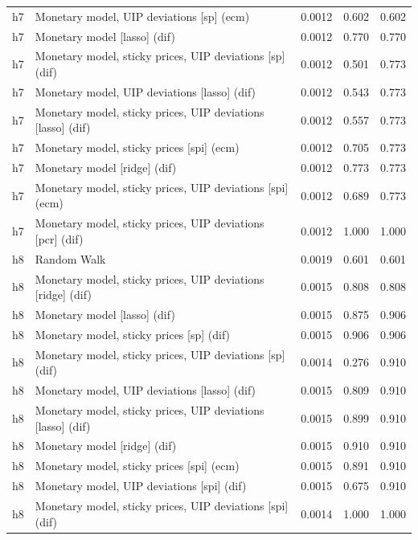 \begin{ThreePartTable}
\begin{longtable}[t]{cp{5.5cm}ccc}
h7 & \raggedright Monetary model, UIP deviations [sp] (ecm) & 0.0012 & 0.602 & 0.602\\
h7 & \raggedright Monetary model [lasso] (dif) & 0.0012 & 0.770 & 0.770\\
h7 & \raggedright Monetary model, sticky prices, UIP deviations [sp] (dif) & 0.0012 & 0.501 & 0.773\\
h7 & \raggedright Monetary model, UIP deviations [lasso] (dif) & 0.0012 & 0.543 & 0.773\\
h7 & \raggedright Monetary model, sticky prices, UIP deviations [lasso] (dif) & 0.0012 & 0.557 & 0.773\\
h7 & \raggedright Monetary model, sticky prices [spi] (ecm) & 0.0012 & 0.705 & 0.773\\
h7 & \raggedright Monetary model [ridge] (dif) & 0.0012 & 0.773 & 0.773\\
h7 & \raggedright Monetary model, sticky prices, UIP deviations [spi] (ecm) & 0.0012 & 0.689 & 0.773\\
h7 & \raggedright Monetary model, sticky prices, UIP deviations [pcr] (dif) & 0.0012 & 1.000 & 1.000\\
\addlinespace
h8 & \raggedright Random Walk & 0.0019 & 0.601 & 0.601\\
h8 & \raggedright Monetary model, sticky prices, UIP deviations [ridge] (dif) & 0.0015 & 0.808 & 0.808\\
h8 & \raggedright Monetary model [lasso] (dif) & 0.0015 & 0.875 & 0.906\\
h8 & \raggedright Monetary model, sticky prices [sp] (dif) & 0.0015 & 0.906 & 0.906\\
h8 & \raggedright Monetary model, sticky prices, UIP deviations [sp] (dif) & 0.0014 & 0.276 & 0.910\\
h8 & \raggedright Monetary model, UIP deviations [lasso] (dif) & 0.0015 & 0.809 & 0.910\\
h8 & \raggedright Monetary model, sticky prices, UIP deviations [lasso] (dif) & 0.0015 & 0.899 & 0.910\\
h8 & \raggedright Monetary model [ridge] (dif) & 0.0015 & 0.910 & 0.910\\
h8 & \raggedright Monetary model, sticky prices [spi] (ecm) & 0.0015 & 0.891 & 0.910\\
h8 & \raggedright Monetary model, UIP deviations [spi] (dif) & 0.0015 & 0.675 & 0.910\\
h8 & \raggedright Monetary model, sticky prices, UIP deviations [spi] (dif) & 0.0014 & 1.000 & 1.000\\

\end{longtable}
\end{ThreePartTable}
